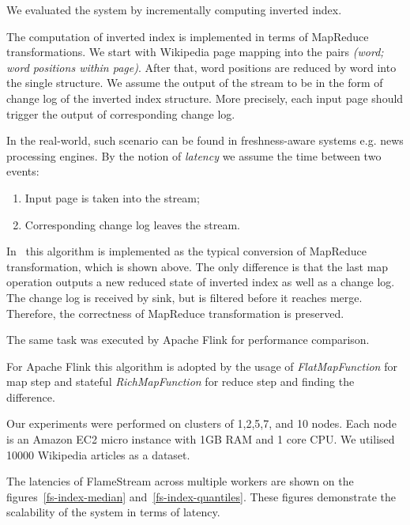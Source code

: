 
\label{fs-experiments-section}

We evaluated the system by incrementally computing inverted index.

The computation of inverted index is implemented in terms of MapReduce transformations. We start with Wikipedia page mapping into the pairs {\it (word; word positions within page)}. After that, word positions are reduced by word into the single structure. We assume the output of the stream to be in the form of change log of the inverted index structure. More precisely, each input page should trigger the output of corresponding change log. 

In the real-world, such scenario can be found in freshness-aware systems e.g. news processing engines. By the notion of {\it latency} we assume the time between two events: 
\begin{enumerate}
    \item Input page is taken into the stream;
    \item Corresponding change log leaves the stream.
\end{enumerate}

In \FlameStream\ this algorithm is implemented as the typical conversion of MapReduce transformation, which is shown above. The only difference is that the last map operation outputs a new reduced state of inverted index as well as a change log. The change log is received by sink, but is filtered before it reaches merge. Therefore, the correctness of MapReduce transformation is preserved.

The same task was executed by Apache Flink for performance comparison.

For Apache Flink this algorithm is adopted by the usage of {\it FlatMapFunction} for map step and stateful {\it RichMapFunction} for reduce step and finding the difference.

Our experiments were performed on clusters of 1,2,5,7, and 10 nodes. Each node is an Amazon EC2 micro instance with 1GB RAM and 1 core CPU. We utilised 10000 Wikipedia articles as a dataset. 

The latencies of FlameStream across multiple workers are shown on the figures~\ref{fs-index-median} and~\ref{fs-index-quantiles}. These figures demonstrate the scalability of the system in terms of latency.

